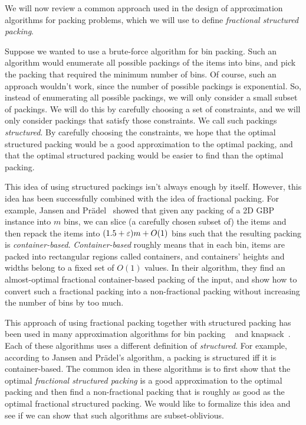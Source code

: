 We will now review a common approach used in the design of
approximation algorithms for packing problems,
which we will use to define \emph{fractional structured packing}.

Suppose we wanted to use a brute-force algorithm for bin packing.
Such an algorithm would enumerate all possible packings of the items into bins,
and pick the packing that required the minimum number of bins.
Of course, such an approach wouldn't work,
since the number of possible packings is exponential.
So, instead of enumerating all possible packings,
we will only consider a small subset of packings.
We will do this by carefully choosing a set of constraints,
and we will only consider packings that satisfy those constraints.
We call such packings \emph{structured}.
By carefully choosing the constraints, we hope that the
optimal structured packing would be a good approximation to the optimal packing,
and that the optimal structured packing would be easier to find than the optimal packing.

This idea of using structured packings isn't always enough by itself.
However, this idea has been successfully combined with the idea of fractional packing.
For example, Jansen and Pr\"adel~\cite{jansen2016new} showed that
given any packing of a 2D GBP instance into $m$ bins,
we can slice (a carefully chosen subset of) the items and then repack the items
into $(1.5+\varepsilon)m + O(1)$ bins such that the resulting packing is \emph{container-based}.
\emph{Container-based} roughly means that in each bin,
items are packed into rectangular regions called containers,
and containers' heights and widths belong to a fixed set of $O(1)$ values.
In their algorithm, they find an almost-optimal fractional container-based packing
of the input, and show how to convert such a fractional packing into
a non-fractional packing without increasing the number of bins by too much.

This approach of using fractional packing together with structured packing
has been used in many approximation algorithms for bin packing
~\cite{jansen2016new,bansal2005tale} and knapsack~\cite{galvez2017approximating}.
Each of these algorithms uses a different definition of \emph{structured}.
For example, according to Jansen and Pr\"adel's algorithm,
a packing is structured iff it is container-based.
The common idea in these algorithms is to first show that the optimal
\emph{fractional structured packing} is a good approximation to the optimal packing
and then find a non-fractional packing that is roughly as good as the
optimal fractional structured packing.
We would like to formalize this idea and see if we can show that
such algorithms are subset-oblivious.

